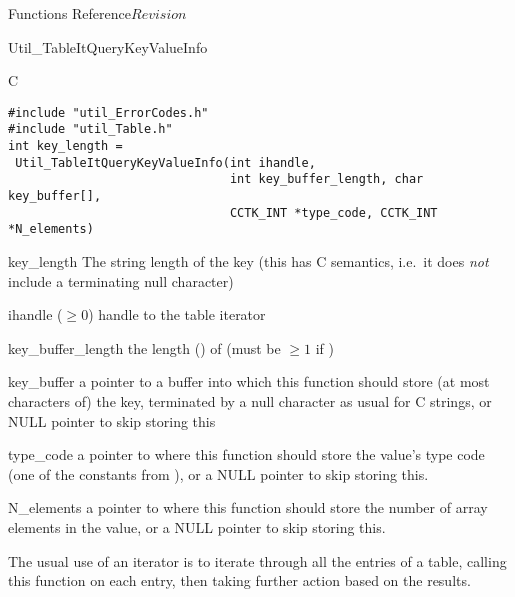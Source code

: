 \begin{cactuspart}{ Functions Reference}{}{$Revision$}
\begin{FunctionDescription}{Util\_TableItQueryKeyValueInfo}
\begin{SynopsisSection}
\begin{Synopsis}{C}
\begin{verbatim}
#include "util_ErrorCodes.h"
#include "util_Table.h"
int key_length =
 Util_TableItQueryKeyValueInfo(int ihandle,
                               int key_buffer_length, char key_buffer[],
                               CCTK_INT *type_code, CCTK_INT *N_elements)
\end{verbatim}
\end{Synopsis}
\end{SynopsisSection}

\begin{ResultSection}
\begin{Result}{key\_length}
The string length of the key
(this has C  semantics, i.e.\ it does {\em not\/}
include a terminating null character)
\end{Result}
\end{ResultSection}

\begin{ParameterSection}
\begin{Parameter}{ihandle ($\ge 0$)}
handle to the table iterator
\end{Parameter}
\begin{Parameter}{key\_buffer\_length}
\quad
the length () of 
(must be $\ge 1$ if )
\end{Parameter}
\begin{Parameter}{key\_buffer}
a pointer to a buffer into which this function should store
(at most  characters of) the key,
terminated by a null character as usual for C strings,
or NULL pointer to skip storing this
\end{Parameter}
\begin{Parameter}{type\_code}
a pointer to where this function should store the value's type code
(one of the  constants from ),
or a NULL pointer to skip storing this.
\end{Parameter}
\begin{Parameter}{N\_elements}
a pointer to where this function should store
the number of array elements in the value,
or a NULL pointer to skip storing this.
\end{Parameter}
\end{ParameterSection}

\begin{Discussion}
The usual use of an iterator is to iterate through all the entries
of a table, calling this function on each entry, then taking further
action based on the results.


\end{Discussion}
\end{FunctionDescription}
\end{cactuspart}
